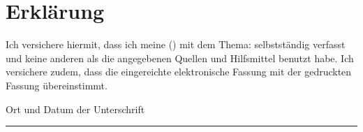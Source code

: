 
\thispagestyle{empty}

\section*{Erklärung}
\vspace*{2em}


Ich versichere hiermit, dass ich meine  () mit dem Thema: \textit{} selbstständig verfasst 
und keine anderen als die angegebenen Quellen und Hilfsmittel benutzt habe. Ich versichere 
zudem, dass die eingereichte elektronische Fassung mit der gedruckten Fassung übereinstimmt.

\vspace{3em}

{\color{red}Ort und Datum der Unterschrift}
\vspace{4em}

\rule{7cm}{0.4pt}\\
